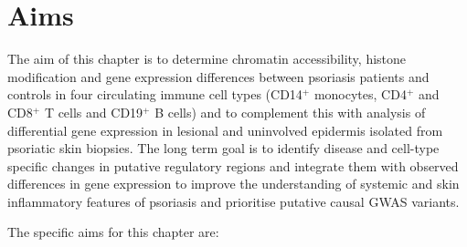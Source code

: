 




\section{Aims}
The aim of this chapter is to determine chromatin accessibility, histone modification and gene expression differences between psoriasis patients and controls in four circulating immune cell types (CD14$^+$ monocytes, CD4$^+$ and CD8$^+$ T cells and CD19$^+$ B cells) and to complement this with analysis of differential gene expression in lesional and uninvolved epidermis isolated from psoriatic skin biopsies. The long term goal is to identify disease and cell-type specific changes in putative regulatory regions and integrate them with observed differences in gene expression to improve the understanding of systemic and skin inflammatory features of psoriasis and prioritise putative causal GWAS variants.

The specific aims for this chapter are:

